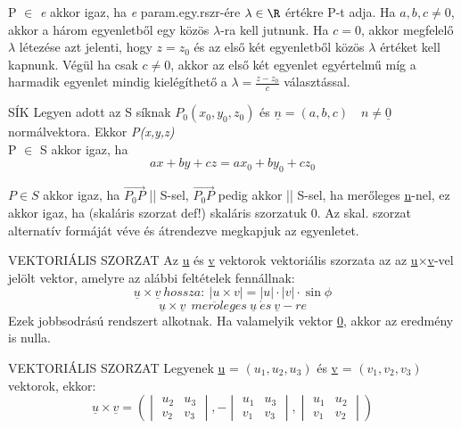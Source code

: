\begin{bizonyitas}{}
P $\in$ \textit{e} akkor igaz, ha \textit{e} param.egy.rszr-ére $\lambda \in \R$ értékre P-t adja. Ha $a,b,c \neq 0$, akkor a három egyenletből egy közös $\lambda$-ra kell jutnunk. Ha $c=0$, akkor megfelelő $\lambda$ létezése azt jelenti, hogy $z=z_0$ és az első két egyenletből közös $\lambda$ értéket kell kapnunk. Végül ha csak $c\neq0$, akkor az első két egyenlet egyértelmű míg a harmadik egyenlet mindig kielégíthető a $\lambda = \frac{z-z_0}{c}$ választással.
\end{bizonyitas}

\begin{tetel}{SÍK}
Legyen adott az S síknak $P_0(x_0,y_0,z_0)$ és $\underline{n} = (a,b,c)\quad n\neq \underline{0}$ normálvektora. Ekkor \textit{P(x,y,z)}\\ P $\in$ S akkor igaz, ha
$$ax+by+cz=ax_0+by_0+cz_0$$
\end{tetel}

\begin{bizonyitas}{}
$P \in S$ akkor igaz, ha $\vec{P_0P}$ || S-sel, $\vec{P_0P}$ pedig akkor || S-sel, ha merőleges \underline{n}-nel, ez akkor igaz, ha (skaláris szorzat def!) skaláris szorzatuk 0. Az skal. szorzat alternatív formáját véve és átrendezve megkapjuk az egyenletet.
\end{bizonyitas}

\begin{definicio}{VEKTORIÁLIS SZORZAT}
Az \underline{u} és \underline{v} vektorok vektoriális szorzata az az \underline{u}×\underline{v}-vel jelölt
vektor, amelyre az alábbi feltételek fennállnak:
$$\underline{u} \times \underline{v}\: hossza:\: |u \times v| = |u| \cdot |v| \cdot\sin\phi$$
$$\underline{u} \times \underline{v}\ \: mer\ddot{o}leges\: \underline{u}\: \acute{e}s\: \underline{v}-re$$
Ezek jobbsodrású rendszert alkotnak. Ha valamelyik vektor \underline{0}, akkor az eredmény is nulla.
\end{definicio}

\begin{tetel}{VEKTORIÁLIS SZORZAT}
Legyenek \underline{u} = $(u_1,u_2,u_3)$ és \underline{v} = $(v_1,v_2,v_3)$ vektorok, ekkor:
$$\underline{u}\times\underline{v} = \left( \begin{vmatrix}
u_2&u_3\\v_2&v_3\end{vmatrix},-\begin{vmatrix}
u_1&u_3\\v_1&v_3\end{vmatrix},\begin{vmatrix}
u_1&u_2\\v_1&v_2\end{vmatrix} \right)$$
\end{tetel}

